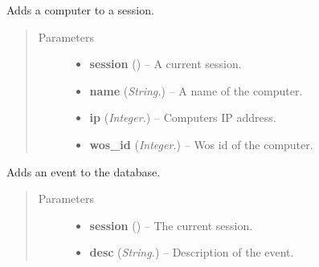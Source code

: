 \documentclass[letterpaper,10pt,english]{sphinxmanual}
\begin{document}
\begin{fulllineitems}
\label{api:controller.AddComputerToSession}
Adds a computer to a session.
\begin{quote}\begin{description}
\item[{Parameters}] \leavevmode\begin{itemize}
\item {} 
\textbf{session} ({\hyperref[api:models.Session]{}}) -- A current session.

\item {} 
\textbf{name} (\emph{String.}) -- A name of the computer.

\item {} 
\textbf{ip} (\emph{Integer.}) -- Computers IP address.

\item {} 
\textbf{wos\_id} (\emph{Integer.}) -- Wos id of the computer.

\end{itemize}

\end{description}\end{quote}

\end{fulllineitems}


\begin{fulllineitems}
\label{api:controller.AddEvent}
Adds an event to the database.
\begin{quote}\begin{description}
\item[{Parameters}] \leavevmode\begin{itemize}
\item {} 
\textbf{session} ({\hyperref[api:models.Session]{}}) -- The current session.

\item {} 
\textbf{desc} (\emph{String.}) -- Description of the event.

\end{itemize}

\end{description}\end{quote}

\end{fulllineitems}
\end{document}
